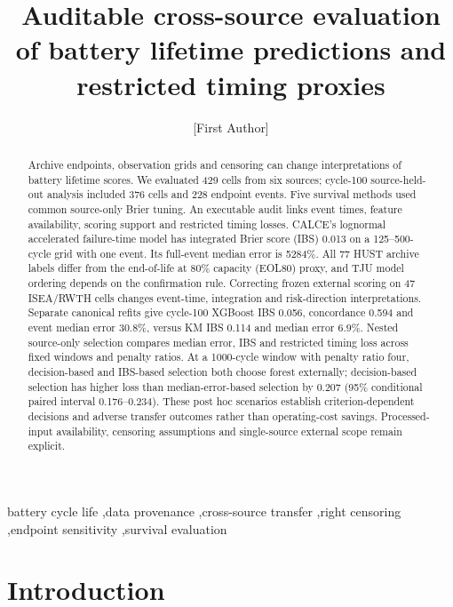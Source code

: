 \documentclass[preprint,12pt]{elsarticle}
\begin{document}
\begin{frontmatter}
\title{Auditable cross-source evaluation of battery lifetime predictions and restricted timing proxies}
\author[aff1]{[First Author]}
\begin{abstract}
Archive endpoints, observation grids and censoring can change interpretations of battery lifetime scores. We evaluated 429 cells from six sources; cycle-100 source-held-out analysis included 376 cells and 228 endpoint events. Five survival methods used common source-only Brier tuning. An executable audit links event times, feature availability, scoring support and restricted timing losses. CALCE's lognormal accelerated failure-time model has integrated Brier score (IBS) 0.013 on a 125--500-cycle grid with one event. Its full-event median error is 5284\%. All 77 HUST archive labels differ from the end-of-life at 80\% capacity (EOL80) proxy, and TJU model ordering depends on the confirmation rule. Correcting frozen external scoring on 47 ISEA/RWTH cells changes event-time, integration and risk-direction interpretations. Separate canonical refits give cycle-100 XGBoost IBS 0.056, concordance 0.594 and event median error 30.8\%, versus KM IBS 0.114 and median error 6.9\%. Nested source-only selection compares median error, IBS and restricted timing loss across fixed windows and penalty ratios. At a 1000-cycle window with penalty ratio four, decision-based and IBS-based selection both choose forest externally; decision-based selection has higher loss than median-error-based selection by 0.207 (95\% conditional paired interval 0.176--0.234). These post hoc scenarios establish criterion-dependent decisions and adverse transfer outcomes rather than operating-cost savings. Processed-input availability, censoring assumptions and single-source external scope remain explicit.
\end{abstract}
\begin{keyword}
battery cycle life \sep data provenance \sep cross-source transfer \sep right censoring \sep endpoint sensitivity \sep survival evaluation
\end{keyword}
\end{frontmatter}

\section{Introduction}
\end{document}
